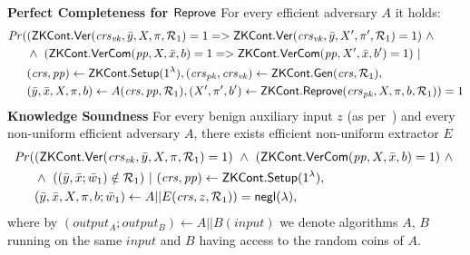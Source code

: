 \begin{definition}[ZK Continuations]
\noindent \textbf{Perfect Completeness for ${\mathsf{Reprove}}$} For every efficient adversary $A$ it holds: 
\begin{align*}
\mathit{Pr} (& (\ZKCont.\Verify(\crsvk, \bar{y}, X, \pi, \relone) = 1  = >  \ZKCont.\Verify(\crsvk, \bar{y}, X', \pi', \relone) = 1)  \ \wedge \  \\
                   & \wedge \ (\ZKCont.\VerifyCom (\pp, X, \barx, b) = 1 => \ZKCont.\VerifyCom (\pp, X', \barx, b') = 1) \ | \\
                   & (\crs, \pp) \leftarrow \ZKCont.\Setup (1^{\lambda}), (\crspk, \crsvk) \leftarrow \ZKCont.\Gen(\crs, \relone), \\ 
                   & (\bary, \barx, X, \pi, b) \leftarrow A(\crs,\pp, \relone), (X', \pi', b') \leftarrow \ZKCont.\Reprove(\crspk, X, \pi, b, \relone)) = 1
\end{align*}
\noindent \textbf{Knowledge Soundness} For every benign auxiliary input $z$ (as per~\cite{bening_auxiliary}) and 
every non-uniform efficient adversary $A$, there exists efficient non-uniform extractor $E$  
\begin{align*}
\mathit{Pr} (& ({\mathsf{ZKCont}}.{\mathsf{Ver}}(\mathit{crs}_{\mathit{vk}}, \bar{y}, X, \pi, \mathcal{R}_1) = 1) \ \wedge \ ({\mathsf{ZKCont}}.{\mathsf{VerCom}}(\mathit{pp}, X, \bar{x}, b) = 1) \ \wedge\ \\
                   & \wedge \ ( (\bar{y}, \bar{x}; \bar{w}_1) \notin \mathcal{R}_1) \ | \ (\mathit{crs}, \mathit{pp}) \leftarrow {\ensuremath{\mathsf{ZKCont}}}.{\mathsf{Setup}} (1^{\lambda}), \\
                   & (\bar{y}, \bar{x}, X, \pi, b; \bar{w}_1 ) \leftarrow A || E (\mathit{crs}, z, \mathcal{R}_1)) = \mathsf{negl} (\lambda),
\end{align*}
\noindent %
where by $(\mathit{output_{A}};\mathit{output_{B}}) \leftarrow A || B(\mathit{input})$ we denote algorithms $A$, $B$  running on the same 
$\mathit{input}$ and $B$ having access to the random coins of $A$. \\


\end{definition}
